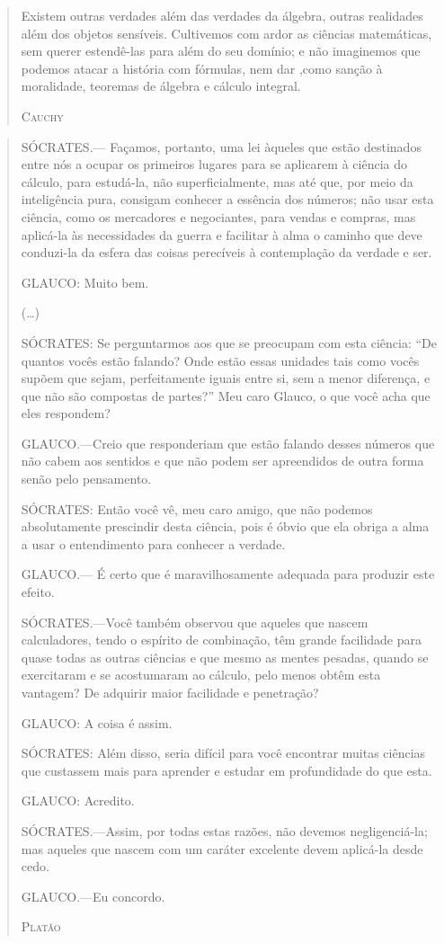 \documentclass{hipatia}
\begin{document}
\begin{quote}
Existem outras verdades além das verdades da álgebra, outras realidades além dos objetos sensíveis. Cultivemos com ardor as ciências matemáticas, sem querer estendê-las para além do seu domínio; e não imaginemos que podemos atacar a história com fórmulas, nem dar ,como sanção à moralidade, teoremas de álgebra e cálculo integral.

\hfill \textsc{Cauchy}
\end{quote}

 


\begin{quote}
SÓCRATES.--- Façamos, portanto, uma lei àqueles que estão destinados entre nós a ocupar os primeiros lugares para se aplicarem à ciência do cálculo, para estudá-la, não superficialmente, mas até que, por meio da inteligência pura, consigam conhecer a essência dos números; não usar esta ciência, como os mercadores e negociantes, para vendas e compras, mas aplicá-la às necessidades da guerra e facilitar à alma o caminho que deve conduzi-la da esfera das coisas perecíveis à contemplação da verdade e ser.

GLAUCO: Muito bem.

(\dots)

SÓCRATES: Se perguntarmos aos que se preocupam com esta ciência: ``De quantos vocês estão falando? Onde estão essas unidades tais como vocês supõem que sejam, perfeitamente iguais entre si, sem a menor diferença, e que não são compostas de partes?'' Meu caro Glauco, o que você acha que eles respondem?

GLAUCO.---Creio que responderiam que estão falando desses números que não cabem aos sentidos e que não podem ser apreendidos de outra forma senão pelo pensamento.

SÓCRATES: Então você vê, meu caro amigo, que não podemos absolutamente prescindir desta ciência, pois é óbvio que ela obriga a alma a usar o entendimento para conhecer a verdade.

GLAUCO.--- É certo que é maravilhosamente adequada para produzir este efeito.

SÓCRATES.---Você também observou que aqueles que nascem calculadores, tendo o espírito de combinação, têm grande facilidade para quase todas as outras ciências e que mesmo as mentes pesadas, quando se exercitaram e se acostumaram ao cálculo, pelo menos obtêm esta vantagem? De adquirir maior facilidade e penetração?

GLAUCO: A coisa é assim.

SÓCRATES: Além disso, seria difícil para você encontrar muitas ciências que custassem mais para aprender e estudar em profundidade do que esta.

GLAUCO: Acredito.

SÓCRATES.---Assim, por todas estas razões, não devemos negligenciá-la; mas aqueles que nascem com um caráter excelente devem aplicá-la desde cedo.

GLAUCO.---Eu concordo.

\hfill \textsc{Platão}
\end{quote}
 
\end{document}
